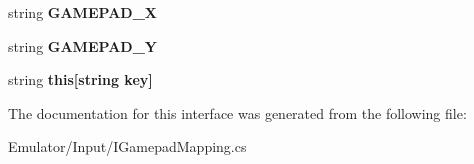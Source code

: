 \begin{DoxyCompactItemize}
\item 
\hypertarget{interface_snowflake_1_1_emulator_1_1_input_1_1_i_gamepad_mapping_a504dd81ab33d335b8577be71523e9743}{}string {\bfseries G\+A\+M\+E\+P\+A\+D\+\_\+\+X}\label{interface_snowflake_1_1_emulator_1_1_input_1_1_i_gamepad_mapping_a504dd81ab33d335b8577be71523e9743}

\item 
\hypertarget{interface_snowflake_1_1_emulator_1_1_input_1_1_i_gamepad_mapping_abfef9537c03817def41c6401027cdca5}{}string {\bfseries G\+A\+M\+E\+P\+A\+D\+\_\+\+Y}\label{interface_snowflake_1_1_emulator_1_1_input_1_1_i_gamepad_mapping_abfef9537c03817def41c6401027cdca5}

\item 
\hypertarget{interface_snowflake_1_1_emulator_1_1_input_1_1_i_gamepad_mapping_a203e65ccf8e6d672150df9d9d58ddd9e}{}string {\bfseries this\mbox{[}string key\mbox{]}}\label{interface_snowflake_1_1_emulator_1_1_input_1_1_i_gamepad_mapping_a203e65ccf8e6d672150df9d9d58ddd9e}

\end{DoxyCompactItemize}


The documentation for this interface was generated from the following file\+:\begin{DoxyCompactItemize}
\item 
Emulator/\+Input/I\+Gamepad\+Mapping.\+cs\end{DoxyCompactItemize}
